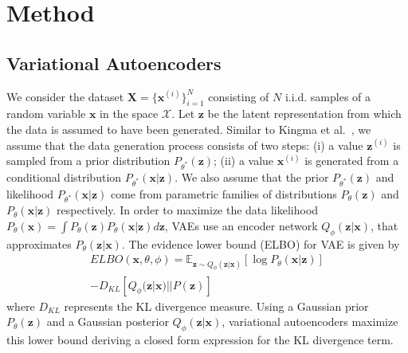 \documentclass[letterpaper]{article} %
\begin{document}
\section{Method}

\subsection{Variational Autoencoders}

We consider the dataset $\mathbf{X}=\{\mathbf{x}^{(i)}\}_{i=1}^{N}$ consisting of $N$ i.i.d. samples of a random variable $\mathbf{x}$ in the space $\mathcal{X}$. Let $\mathbf{z}$ be the latent representation from which the data is assumed to have been generated. Similar to Kingma et al.~, we assume that the data generation process consists of two steps: (i) a value $\mathbf{z}^{(i)}$ is sampled from a prior distribution $P_{\theta^{*}}(\mathbf{z})$; (ii) a value $\mathbf{x}^{(i)}$ is generated from a conditional distribution $P_{\theta^{*}}(\mathbf{x|z})$. We also assume that the prior $P_{\theta^{*}}(\mathbf{z})$ and likelihood $P_{\theta^{*}}(\mathbf{x|z})$ come from parametric families of distributions $P_{\theta}(\mathbf{z})$ and $P_{\theta}(\mathbf{x|z})$ respectively. In order to maximize the data likelihood $P_{\theta}(\mathbf{x}) = \int P_{\theta}(\mathbf{z})P_{\theta}(\mathbf{x}|\mathbf{z})d\mathbf{z}$, VAEs  use an encoder network $Q_\phi(\mathbf{z}|\mathbf{x})$, that approximates $P_\theta(\mathbf{z}|\mathbf{x})$. The evidence lower bound (ELBO) for VAE is given by
\begin{equation}
\begin{split}
ELBO(\mathbf{x},\theta,\phi) = \mathbb{E}_{\mathbf{z}\sim Q_{\phi}(\mathbf{z}|\mathbf{x})}[\log P_\theta(\mathbf{x}|\mathbf{z})]\\
- D_{\mathit{KL}}[Q_{\phi}(\mathbf{z}|\mathbf{x}) || P(\mathbf{z})]
\end{split}
\label{vae_loss}
\end{equation}
where $D_{\mathit{\mathit{KL}}}$ represents the KL divergence measure. Using a Gaussian prior $P_{\theta}(\mathbf{z})$ and a Gaussian posterior $Q_{\phi}(\mathbf{z}|\mathbf{x})$, variational autoencoders maximize this lower bound deriving a closed form expression for the KL divergence term.
\end{document}

